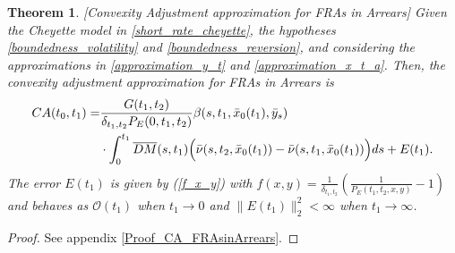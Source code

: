 \documentclass[a4paper,10pt]{article}
\newtheorem{theorem}{Theorem}[section]
\newcommand{\1}{\mathbf{1}}
\begin{document}
\begin{theorem}\label{Th_CA_FRAsinArrears}[Convexity Adjustment approximation for FRAs in Arrears]
Given the Cheyette model in \eqref{short_rate_cheyette}, the hypotheses \ref{boundedness_volatility} and \ref{boundedness_reversion}, and considering the approximations in \eqref{approximation_y_t} and \eqref{approximation_x_t_a}. Then, the convexity adjustment approximation for FRAs in Arrears is 
\begin{align}\label{ca_approximations_fra_arrears}
CA(t_0,t_1) =   &\frac{G(t_1,t_2)}{\delta_{t_1,t_2}P_{E}(0,t_1,t_2)} \beta(s,t_1, \bar{x}_0(t_1), \bar{y}_s) \nonumber \\
&\cdot \int_{0}^{t_1} \overline{DM}(s,t_1) \Bigl(\bar{\nu}(s,t_2,\bar{x}_{0}(t_1))-\bar{\nu}(s,t_1,\bar{x}_{0}(t_1))\Bigr) ds  + E(t_1).
\end{align}
The error $E(t_1)$ is given by (\ref{f_x_y}) with $f(x,y)=\frac{1}{\delta_{t_1,t_2}}\left(\frac{1}{P_{E}(t_1,t_2,x,y)} - 1 \right)$ and behaves as $\mathcal{O}(t_1)$ when $t_1 \to 0$ and $\|E(t_1)\|^{2}_{2} < \infty$ when $t_1 \to \infty$. 
\end{theorem}
\begin{proof}
See appendix \ref{Proof_CA_FRAsinArrears}.
\end{proof}
\end{document}
